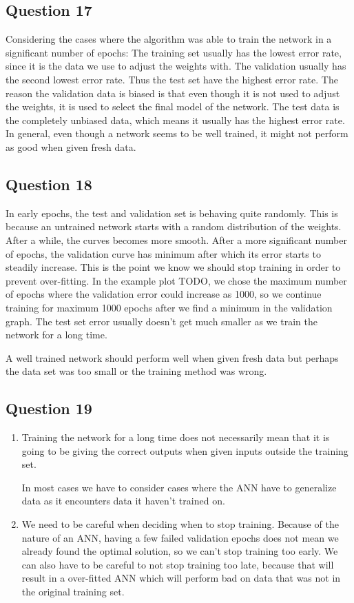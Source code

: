 \documentclass[a4paper]{article}
\begin{document}
\subsection*{Question 17}
Considering the cases where the algorithm was able to train the network in a significant number of epochs: 
The training set usually has the lowest error rate, since it is the data we use to adjust the weights with. The validation usually has the second lowest error rate. Thus the test set have the highest error rate. The reason the validation data is biased is that even though it is not used to adjust the weights, it is used to select the final model of the network. The test data is the completely unbiased data, which means it usually has the highest error rate. 
In general, even though a network seems to be well trained, it might not perform as good when given fresh data.

\subsection*{Question 18}
In early epochs, the test and validation set is behaving quite randomly. This is because an untrained network starts with a random distribution of the weights. After a while, the curves becomes more smooth. 
After a more significant number of epochs, the validation curve
has minimum after which its error starts to steadily increase. This is the point we know we should stop training in order to prevent over-fitting. 
In the example plot TODO, we chose the maximum number of epochs where the validation error could increase as 1000, so we continue training for maximum 1000 epochs after we find a minimum in the validation graph. The test set error usually doesn't get much smaller as we train the network for a long time. 

A well trained network should perform well when given fresh data but perhaps the data set was too small or the training method was wrong.

\subsection*{Question 19}
\begin{enumerate}
\item Training the network for a long time does not necessarily mean that it is going to be giving the correct outputs when given inputs outside the training set.

In most cases we have to consider cases where the ANN have to generalize data as it encounters data it haven't trained on.  

\item We need to be careful when deciding when to stop training. Because of the nature of an ANN, having a few failed validation epochs does not mean we already found the optimal solution, so we can't stop training too early. We can also have to be careful to not stop training too late, because that will result in a over-fitted ANN which will perform bad on data that was not in the original training set. 
\end{enumerate}
\end{document}
